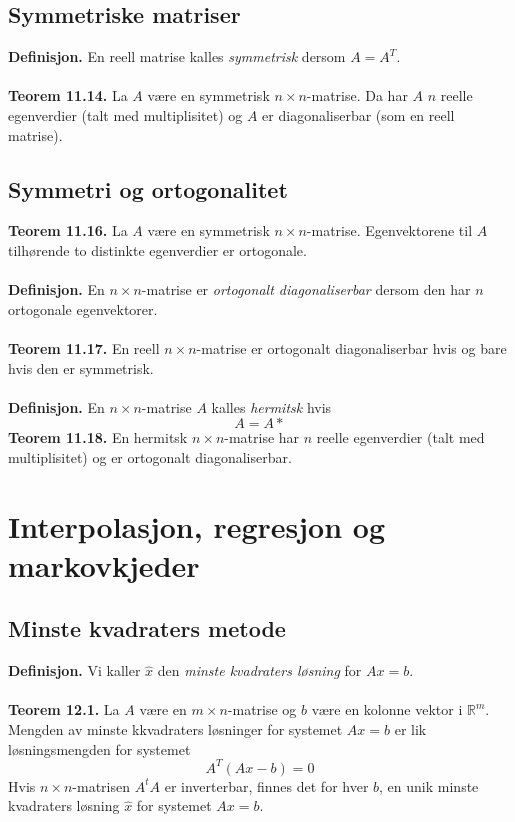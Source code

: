 \documentclass{article}
\begin{document}
\subsection{Symmetriske matriser}
\textbf{Definisjon.} En reell matrise kalles \textit{symmetrisk} dersom $A = A^T$.
\\\\
\textbf{Teorem 11.14.} La $A$ være en symmetrisk $n \times n$-matrise. Da har $A$ $n$ reelle egenverdier (talt med multiplisitet) og $A$ er diagonaliserbar (som en reell matrise).


\subsection{Symmetri og ortogonalitet}
\textbf{Teorem 11.16.} La $A$ være en symmetrisk $n \times n$-matrise. Egenvektorene til $A$ tilhørende to distinkte egenverdier er ortogonale.
\\\\
\textbf{Definisjon.} En $n \times n$-matrise er \textit{ortogonalt diagonaliserbar} dersom den har $n$ ortogonale egenvektorer.
\\\\
\textbf{Teorem 11.17.} En reell $n \times n$-matrise er ortogonalt diagonaliserbar hvis og bare hvis den er symmetrisk.
\\\\
\textbf{Definisjon.} En $n \times n$-matrise $A$ kalles \textit{hermitsk} hvis
\[ A = A* \]
\textbf{Teorem 11.18.} En hermitsk $n \times n$-matrise har $n$ reelle egenverdier (talt med multiplisitet) og er ortogonalt diagonaliserbar.

\clearpage
\section{Interpolasjon, regresjon og markovkjeder}

\subsection{Minste kvadraters metode}
\textbf{Definisjon.} Vi kaller $\hat{x}$ den \textit{minste kvadraters løsning} for $Ax = b$.
\\\\
\textbf{Teorem 12.1.} La $A$ være en $m \times n$-matrise og $b$ være en kolonne vektor i $\mathbb{R}^m$. Mengden av minste kkvadraters løsninger for systemet $Ax = b$ er lik løsningsmengden for systemet
\[ A^T(Ax-b)=0 \]
Hvis $n \times n$-matrisen $A^tA$ er inverterbar, finnes det for hver $b$, en unik minste kvadraters løsning $\hat{x}$ for systemet $Ax = b$.
\end{document}
